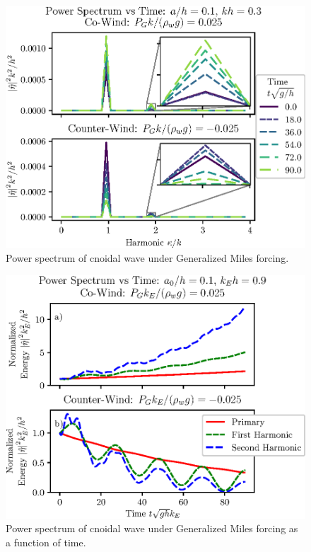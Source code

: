 \documentclass{jfm}
\begin{document}
\begin{figure}
  \centering
  \includegraphics{Power-Spectrum-GM.eps}
  \caption{
    Power spectrum of cnoidal wave under Generalized Miles forcing.
  }
\end{figure}

\begin{figure}
  \centering
  \includegraphics{Power-Spectrum-vs-Time-GM.eps}
  \caption{
    Power spectrum of cnoidal wave under Generalized Miles forcing as a
    function of time.
  }
\end{figure}
\end{document}
